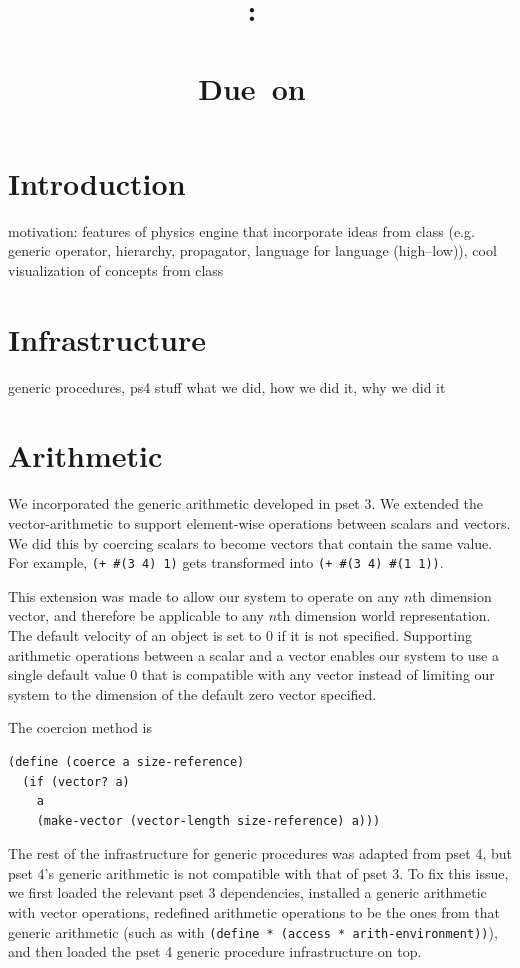 \documentclass{article}
\title{
    \textmd{\hmwkClass:\ \hmwkTitle}\\
    \normalsize{\hmwkClassInstructor}\\
    \small{Due\ on\ \hmwkDueDate}
}
\author{\hmwkAuthorName}
\date{}
\begin{document}
\maketitle
\section{Introduction}

motivation: features of physics engine that incorporate ideas from class (e.g.
generic operator, hierarchy, propagator, language for language (high--low)),
cool visualization of concepts from class

\section{Infrastructure}
generic procedures, ps4 stuff
what we did, how we did it, why we did it

\section{Arithmetic}

We incorporated the generic arithmetic developed in pset 3. We extended the
vector-arithmetic to support element-wise operations between scalars and
vectors. We did this by coercing scalars to become vectors that contain the
same value. For example, \texttt{(+ \#(3 4) 1)} gets transformed into
\texttt{(+ \#(3 4) \#(1 1))}. 

This extension was made to allow our system to operate on any $n$th dimension
vector, and therefore be applicable to any $n$th dimension world
representation. The default velocity of an object is set to 0 if it is not
specified. Supporting arithmetic operations between a scalar and a vector
enables our system to use a single default value 0 that is compatible with any
vector instead of limiting our system to the dimension of the default zero
vector specified.  

The coercion method is 
\begin{verbatim}
(define (coerce a size-reference)
  (if (vector? a)
    a
    (make-vector (vector-length size-reference) a)))
\end{verbatim}

The rest of the infrastructure for generic procedures was adapted from pset 4,
but pset 4's generic arithmetic is not compatible with that of pset 3. To fix
this issue, we first loaded the relevant pset 3 dependencies, installed a
generic arithmetic with vector operations, redefined arithmetic operations to
be the ones from that generic arithmetic (such as with \texttt{(define *
(access * arith-environment))}), and then loaded the pset 4 generic procedure
infrastructure on top.
\end{document}
